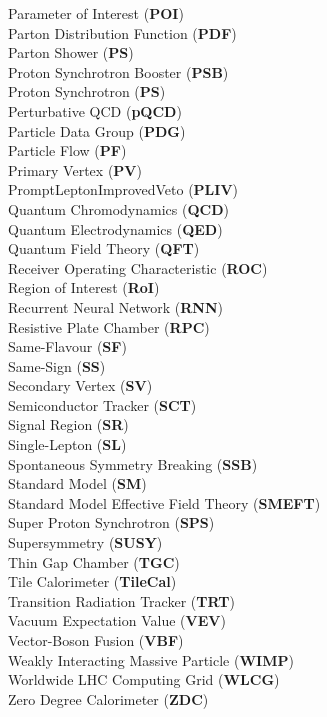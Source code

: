Parameter of Interest (\textbf{POI}) \\
Parton Distribution Function (\textbf{PDF}) \\
Parton Shower (\textbf{PS}) \\
Proton Synchrotron Booster (\textbf{PSB}) \\
Proton Synchrotron (\textbf{PS}) \\
Perturbative QCD (\textbf{pQCD}) \\
Particle Data Group (\textbf{PDG}) \\
Particle Flow (\textbf{PF}) \\
Primary Vertex (\textbf{PV}) \\
PromptLeptonImprovedVeto (\textbf{PLIV}) \\
Quantum Chromodynamics (\textbf{QCD}) \\
Quantum Electrodynamics (\textbf{QED}) \\
Quantum Field Theory (\textbf{QFT}) \\
Receiver Operating Characteristic (\textbf{ROC}) \\
Region of Interest (\textbf{RoI}) \\
Recurrent Neural Network (\textbf{RNN}) \\
Resistive Plate Chamber (\textbf{RPC}) \\
Same-Flavour (\textbf{SF}) \\
Same-Sign (\textbf{SS}) \\
Secondary Vertex (\textbf{SV}) \\
Semiconductor Tracker (\textbf{SCT}) \\
Signal Region (\textbf{SR}) \\
Single-Lepton (\textbf{SL}) \\
Spontaneous Symmetry Breaking (\textbf{SSB}) \\
Standard Model (\textbf{SM}) \\
Standard Model Effective Field Theory (\textbf{SMEFT}) \\
Super Proton Synchrotron (\textbf{SPS}) \\
Supersymmetry (\textbf{SUSY}) \\
Thin Gap Chamber (\textbf{TGC}) \\
Tile Calorimeter (\textbf{TileCal}) \\
Transition Radiation Tracker (\textbf{TRT}) \\
Vacuum Expectation Value (\textbf{VEV}) \\
Vector-Boson Fusion (\textbf{VBF}) \\
Weakly Interacting Massive Particle (\textbf{WIMP}) \\
Worldwide LHC Computing Grid (\textbf{WLCG}) \\
Zero Degree Calorimeter (\textbf{ZDC}) \\
